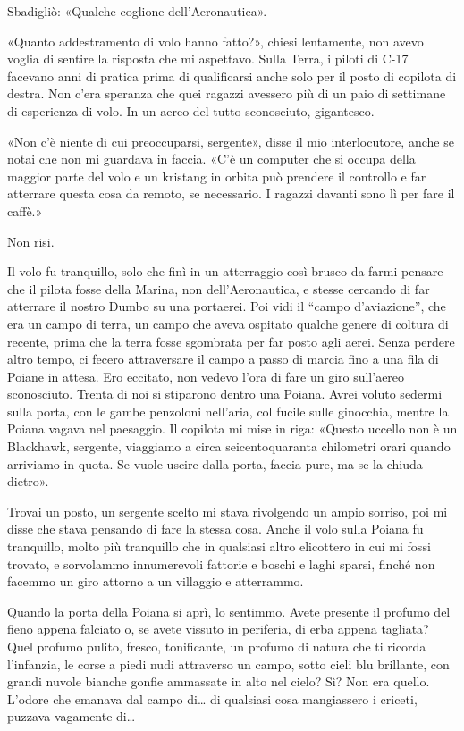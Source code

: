 Sbadigliò: «Qualche coglione dell'Aeronautica».

«Quanto addestramento di volo hanno fatto?», chiesi lentamente, non
avevo voglia di sentire la risposta che mi aspettavo. Sulla Terra, i
piloti di C-17 facevano anni di pratica prima di qualificarsi anche solo
per il posto di copilota di destra. Non c'era speranza che quei ragazzi
avessero più di un paio di settimane di esperienza di volo. In un aereo
del tutto sconosciuto, gigantesco.

«Non c'è niente di cui preoccuparsi, sergente», disse il mio
interlocutore, anche se notai che non mi guardava in faccia. «C'è un
computer che si occupa della maggior parte del volo e un kristang in
orbita può prendere il controllo e far atterrare questa cosa da remoto,
se necessario. I ragazzi davanti sono lì per fare il caffè.»

Non risi.

\hfill\break

Il volo fu tranquillo, solo che finì in un atterraggio così brusco da
farmi pensare che il pilota fosse della Marina, non dell'Aeronautica, e
stesse cercando di far atterrare il nostro Dumbo su una portaerei. Poi
vidi il ``campo d'aviazione'', che era un campo di terra, un campo che
aveva ospitato qualche genere di coltura di recente, prima che la terra
fosse sgombrata per far posto agli aerei. Senza perdere altro tempo, ci
fecero attraversare il campo a passo di marcia fino a una fila di Poiane
in attesa. Ero eccitato, non vedevo l'ora di fare un giro sull'aereo
sconosciuto. Trenta di noi si stiparono dentro una Poiana. Avrei voluto
sedermi sulla porta, con le gambe penzoloni nell'aria, col fucile sulle
ginocchia, mentre la Poiana vagava nel paesaggio. Il copilota mi mise in
riga: «Questo uccello non è un Blackhawk, sergente, viaggiamo a circa
seicentoquaranta chilometri orari quando arriviamo in quota. Se vuole
uscire dalla porta, faccia pure, ma se la chiuda dietro».

Trovai un posto, un sergente scelto mi stava rivolgendo un ampio
sorriso, poi mi disse che stava pensando di fare la stessa cosa. Anche
il volo sulla Poiana fu tranquillo, molto più tranquillo che in
qualsiasi altro elicottero in cui mi fossi trovato, e sorvolammo
innumerevoli fattorie e boschi e laghi sparsi, finché non facemmo un
giro attorno a un villaggio e atterrammo.

\hfill\break

Quando la porta della Poiana si aprì, lo sentimmo. Avete presente il
profumo del fieno appena falciato o, se avete vissuto in periferia, di
erba appena tagliata? Quel profumo pulito, fresco, tonificante, un
profumo di natura che ti ricorda l'infanzia, le corse a piedi nudi
attraverso un campo, sotto cieli blu brillante, con grandi nuvole
bianche gonfie ammassate in alto nel cielo? Sì? Non era quello. L'odore
che emanava dal campo di\ldots{} di qualsiasi cosa mangiassero i
criceti, puzzava vagamente di\ldots{}

